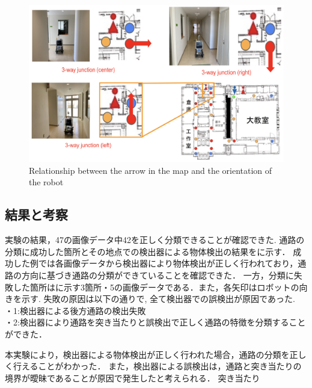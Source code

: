 \documentclass[../main]{subfiles}
\begin{document}
        \begin{figure}[H]
         \centering
         \includegraphics[scale=0.35]{../images/robot_direction.png}
         \caption{Relationship between the arrow in the map and the orientation of the robot}
         \label{figure::experiment1}
        \end{figure}

        \newpage

        \subsection{結果と考察}
        実験の結果，47の画像データ中42を正しく分類できることが確認できた.
        通路の分類に成功した箇所とその地点での検出器による物体検出の結果をに示す．
        成功した例では各画像データから検出器により物体検出が正しく行われており，通路の方向に基づき通路の分類ができていることを確認できた．
        一方，分類に失敗した箇所はに示す3箇所・5の画像データである．また，各矢印はロボットの向きを示す.
        失敗の原因は以下の通りで, 全て検出器での誤検出が原因であった. \\
        ・1:検出器による後方通路の検出失敗\\
        ・2:検出器により通路を突き当たりと誤検出で正しく通路の特徴を分類することができた．

        本実験により，検出器による物体検出が正しく行われた場合，通路の分類を正しく行えることがわかった．
        また，検出器による誤検出は，通路と突き当たりの境界が曖昧であることが原因で発生したと考えられる．
        突き当たり



\end{document}

